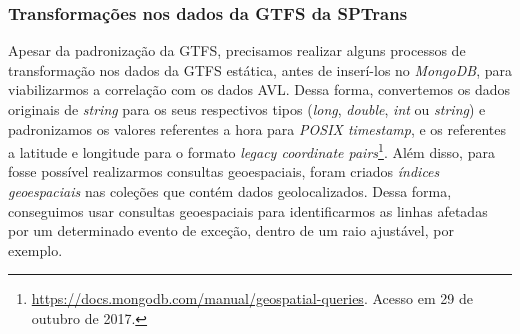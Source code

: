 \documentclass[
	12pt,				%
	oneside,			%
	a4paper,			%
	english,			%
	brazil				%
	]{abntex2ppgsi}
\begin{document}
{{{%


\clearpage

\subsubsection{Transformações nos dados da GTFS da SPTrans}

Apesar da padronização da GTFS, precisamos realizar alguns processos de transformação nos dados da GTFS estática, antes de inserí-los no \textit{MongoDB}, para viabilizarmos a correlação com os dados AVL.  Dessa forma, convertemos os dados originais de \textit{string} para os seus respectivos tipos (\textit{long}, \textit{double}, \textit{int} ou \textit{string}) e padronizamos os valores referentes a hora para \textit{POSIX timestamp}, e os referentes a latitude e longitude para o formato \textit{legacy coordinate pairs}\footnote{\label{geoMongo}\url{https://docs.mongodb.com/manual/geospatial-queries}. Acesso em 29 de outubro de 2017.}. Além disso,  para fosse possível realizarmos consultas geoespaciais, foram criados \textit{índices geoespaciais} nas coleções que contém dados geolocalizados. Dessa forma, conseguimos usar consultas geoespaciais para identificarmos as linhas afetadas por um determinado evento de exceção, dentro de um raio ajustável, por exemplo.

}}}
\end{document}
